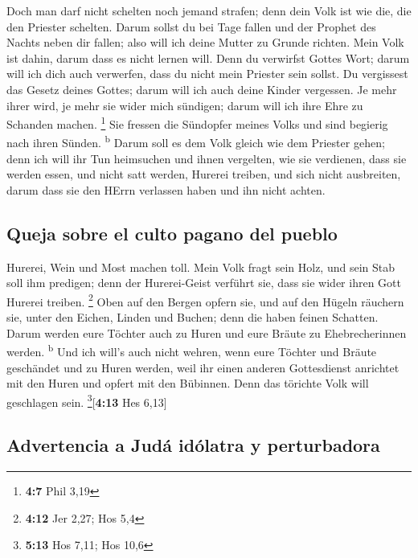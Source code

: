  Doch man darf nicht schelten noch jemand strafen; denn
dein Volk ist wie die, die den Priester schelten.  Darum
sollst du bei Tage fallen und der Prophet des Nachts neben dir fallen;
also will ich deine Mutter zu Grunde richten.  Mein Volk
ist dahin, darum dass es nicht lernen will. Denn du verwirfst Gottes
Wort; darum will ich dich auch verwerfen, dass du nicht mein Priester
sein sollst. Du vergissest das Gesetz deines Gottes; darum will ich auch
deine Kinder vergessen.  Je mehr ihrer wird, je mehr sie
wider mich sündigen; darum will ich ihre Ehre zu Schanden machen.
\footnote{\textbf{4:7} Phil 3,19}  Sie fressen die
Sündopfer meines Volks und sind begierig nach ihren Sünden.
\textsuperscript{b}  Darum soll es dem Volk gleich wie dem
Priester gehen; denn ich will ihr Tun heimsuchen und ihnen vergelten,
wie sie verdienen,  dass sie werden essen, und nicht satt
werden, Hurerei treiben, und sich nicht ausbreiten, darum dass sie den
HErrn verlassen haben und ihn nicht achten.

\hypertarget{queja-sobre-el-culto-pagano-del-pueblo}{%
\subsection{Queja sobre el culto pagano del
pueblo}\label{queja-sobre-el-culto-pagano-del-pueblo}}

 Hurerei, Wein und Most machen toll.  Mein
Volk fragt sein Holz, und sein Stab soll ihm predigen; denn der
Hurerei-Geist verführt sie, dass sie wider ihren Gott Hurerei treiben.
\footnote{\textbf{4:12} Jer 2,27; Hos 5,4}  Oben auf den
Bergen opfern sie, und auf den Hügeln räuchern sie, unter den Eichen,
Linden und Buchen; denn die haben feinen Schatten. Darum werden eure
Töchter auch zu Huren und eure Bräute zu Ehebrecherinnen werden.
\textsuperscript{b}  Und ich will's auch nicht wehren,
wenn eure Töchter und Bräute geschändet und zu Huren werden, weil ihr
einen anderen Gottesdienst anrichtet mit den Huren und opfert mit den
Bübinnen. Denn das törichte Volk will geschlagen sein.
\footnote{\textbf{5:13} Hos 7,11; Hos 10,6}{[}\textbf{4:13} Hes 6,13{]}

\hypertarget{advertencia-a-juduxe1-iduxf3latra-y-perturbadora}{%
\subsection{Advertencia a Judá idólatra y
perturbadora}\label{advertencia-a-juduxe1-iduxf3latra-y-perturbadora}}


